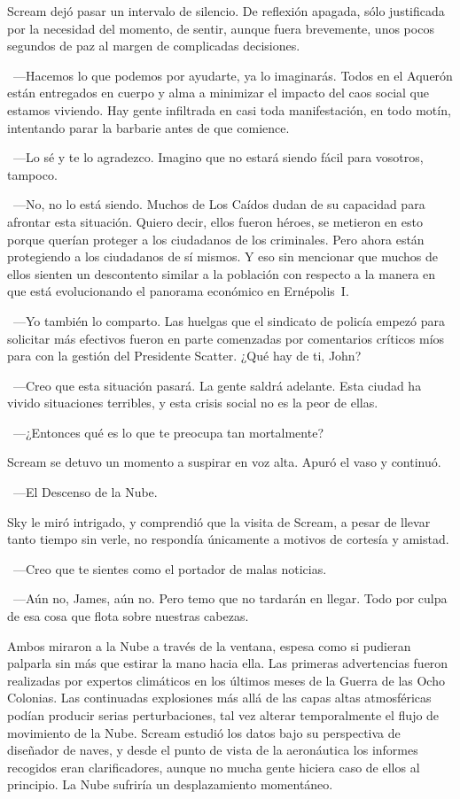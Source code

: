 Scream dejó pasar un intervalo de silencio. De reflexión apagada, sólo justificada por la necesidad del momento, de sentir, aunque fuera brevemente, unos pocos segundos de paz al margen de complicadas decisiones.

~---Hacemos lo que podemos por ayudarte, ya lo imaginarás. Todos en el Aquerón están entregados en cuerpo y alma a minimizar el impacto del caos social que estamos viviendo. Hay gente infiltrada en casi toda manifestación, en todo motín, intentando parar la barbarie antes de que comience.

~---Lo sé y te lo agradezco. Imagino que no estará siendo fácil para vosotros, tampoco.

~---No, no lo está siendo. Muchos de Los Caídos dudan de su capacidad para afrontar esta situación. Quiero decir, ellos fueron héroes, se metieron en esto porque querían proteger a los ciudadanos de los criminales. Pero ahora están protegiendo a los ciudadanos de sí mismos. Y eso sin mencionar que muchos de ellos sienten un descontento similar a la población con respecto a la manera en que está evolucionando el panorama económico en Ernépolis~I.

~---Yo también lo comparto. Las huelgas que el sindicato de policía empezó para solicitar más efectivos fueron en parte comenzadas por comentarios críticos míos para con la gestión del Presidente Scatter. ¿Qué hay de ti, John?

~---Creo que esta situación pasará. La gente saldrá adelante. Esta ciudad ha vivido situaciones terribles, y esta crisis social no es la peor de ellas.

~---¿Entonces qué es lo que te preocupa tan mortalmente?

Scream se detuvo un momento a suspirar en voz alta. Apuró el vaso y continuó.

~---El Descenso de la Nube.

Sky le miró intrigado, y comprendió que la visita de Scream, a pesar de llevar tanto tiempo sin verle, no respondía únicamente a motivos de cortesía y amistad.

~---Creo que te sientes como el portador de malas noticias.

~---Aún no, James, aún no. Pero temo que no tardarán en llegar. Todo por culpa de esa cosa que flota sobre nuestras cabezas.

Ambos miraron a la Nube a través de la ventana, espesa como si pudieran palparla sin más que estirar la mano hacia ella. Las primeras advertencias fueron realizadas por expertos climáticos en los últimos meses de la Guerra de las Ocho Colonias. Las continuadas explosiones más allá de las capas altas atmosféricas podían producir serias perturbaciones, tal vez alterar temporalmente el flujo de movimiento de la Nube. Scream estudió los datos bajo su perspectiva de diseñador de naves, y desde el punto de vista de la aeronáutica los informes recogidos eran clarificadores, aunque no mucha gente hiciera caso de ellos al principio. La Nube sufriría un desplazamiento momentáneo.

